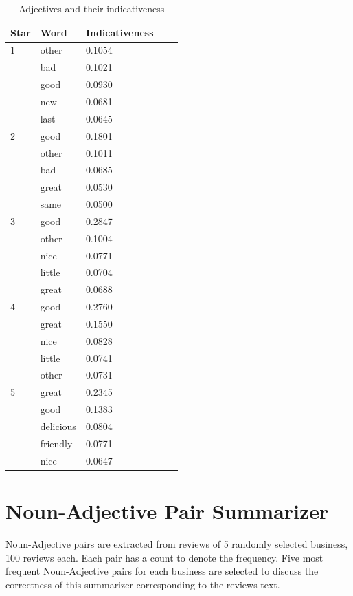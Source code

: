 \documentclass[sigconf]{acmart}
\begin{document}
\begin{table}
  \caption{Adjectives and their indicativeness}
  \label{tab:adj2}
  \begin{tabular}{lllll}
    \toprule
    Star & Word & Indicativeness \\
    \midrule
    1 & other & 0.1054\\ 
    & bad & 0.1021\\ 
    & good & 0.0930\\ 
    & new & 0.0681\\ 
    & last & 0.0645\\
    2 & good & 0.1801\\ 
    & other & 0.1011\\ 
    & bad & 0.0685\\ 
    & great & 0.0530\\ 
    & same & 0.0500\\
    3 & good & 0.2847\\ 
    & other & 0.1004\\ 
    & nice & 0.0771\\ 
    & little & 0.0704\\ 
    & great & 0.0688\\
    4 & good & 0.2760\\ 
    & great & 0.1550\\ 
    & nice & 0.0828\\ 
    & little & 0.0741\\ 
    & other & 0.0731\\
    5 & great & 0.2345\\ 
    & good & 0.1383\\ 
    & delicious & 0.0804\\
    & friendly & 0.0771\\ 
    & nice & 0.0647\\
\end{tabular}
\end{table}


\section{Noun-Adjective Pair Summarizer}
Noun-Adjective pairs are extracted from reviews of 5 randomly selected business, 100 reviews each. Each pair has a count to denote the frequency. Five most frequent Noun-Adjective pairs for each business are selected to discuss the correctness of this summarizer corresponding to the reviews text. 
\end{document}
